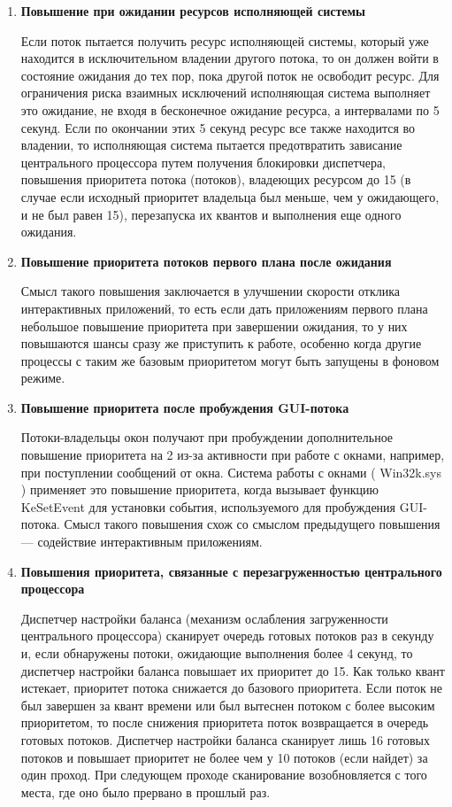 \begin{enumerate}[label={\arabic*.}]
	
	\item \textbf{Повышение при ожидании ресурсов исполняющей системы}
	
	Если поток пытается получить ресурс исполняющей системы, который уже находится в исключительном владении другого потока, то он должен войти в состояние ожидания до тех пор, пока другой поток не освободит ресурс. Для ограничения риска взаимных исключений исполняющая система выполняет это ожидание, не входя в бесконечное ожидание ресурса, а интервалами по 5 секунд. Если по окончании этих 5 секунд ресурс все также находится во владении, то исполняющая система пытается предотвратить зависание центрального процессора путем получения блокировки диспетчера, повышения приоритета потока (потоков), владеющих ресурсом до 15 (в случае если исходный приоритет владельца был меньше, чем у ожидающего, и не был равен 15), перезапуска их квантов и выполнения еще одного ожидания.
	
	\clearpage
	
	\item \textbf{Повышение приоритета потоков первого плана после ожидания}
	
	Смысл такого повышения заключается в улучшении скорости отклика интерактивных приложений, то есть если дать приложениям первого плана небольшое повышение	приоритета при завершении ожидания, то у них повышаются шансы сразу же приступить к работе, особенно когда другие процессы с таким же базовым приоритетом	могут быть запущены в фоновом режиме.
	
	\item \textbf{Повышение приоритета после пробуждения GUI-потока}
	
	Потоки-владельцы окон получают при пробуждении дополнительное повышение приоритета на 2 из-за активности при работе с окнами, например, при поступлении сообщений от окна. Система работы с окнами ( Win32k.sys ) применяет это повышение приоритета, когда вызывает функцию KeSetEvent для установки события, используемого для пробуждения GUI-потока. Смысл такого повышения схож со смыслом 		предыдущего повышения — содействие интерактивным приложениям.
	
	\item \textbf{Повышения приоритета, связанные с перезагруженностью центрального процессора}
	
	Диспетчер настройки баланса (механизм ослабления загруженности центрального процессора) сканирует очередь готовых потоков раз в секунду и, если обнаружены потоки, ожидающие выполнения более 4 секунд, то диспетчер настройки баланса повышает их приоритет до 15. Как только квант истекает, приоритет потока снижается до базового приоритета. Если поток не был завершен за квант времени или был вытеснен потоком с более высоким приоритетом, то после снижения 		приоритета поток возвращается в очередь готовых потоков. Диспетчер настройки баланса сканирует лишь 16 готовых потоков и повышает приоритет не более чем у 10 потоков (если найдет) за один проход. При следующем проходе сканирование возобновляется	с того места, где оно было прервано в прошлый раз. 
	\clearpage
	

\end{enumerate}
